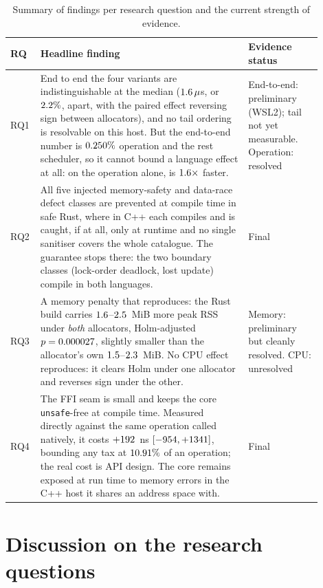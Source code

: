 \documentclass[english,twoside,openright,a4paper,censored,csm,software-track-2020]{HYthesisML}
\begin{document}
\begin{table}
\centering
\caption[Summary of findings per research question]{Summary of findings per research question and the current strength of evidence.
\label{tab:findings}}
\renewcommand{\arraystretch}{1.25}
\begin{tabular}{@{}p{0.06\linewidth} p{0.62\linewidth} p{0.22\linewidth}@{}}
\hline\hline
RQ & Headline finding & Evidence status \\
\hline
RQ1 & End to end the four variants are indistinguishable at the median ($1.6\,\mu$s,
or $2.2\%$, apart, with the paired effect reversing sign between allocators), and no
tail ordering is resolvable on this host. But the end-to-end number is
$0.250\%$ operation and the rest scheduler, so it cannot bound a language effect
at all: on the operation alone, \BudgetCoreFaster{} is $1.6\times$ faster. &
End-to-end: preliminary (WSL2); tail not yet measurable. Operation: resolved \\
RQ2 & All five injected memory-safety and data-race defect classes are prevented at compile
time in safe Rust, where in C++ each compiles and is caught, if at all, only at runtime and no
single sanitiser covers the whole catalogue. The guarantee stops there: the two boundary
classes (lock-order deadlock, lost update) compile in both languages. & Final \\
RQ3 & A memory penalty that reproduces: the Rust build carries
$1.6$--$2.5$~MiB more peak RSS under \emph{both} allocators, Holm-adjusted
$p=0.000027$, slightly smaller than the allocator's own
$1.5$--$2.3$~MiB. No CPU effect reproduces: it clears Holm under one
allocator and reverses sign under the other. & Memory: preliminary but cleanly resolved. CPU:
unresolved \\
RQ4 & The FFI seam is small and keeps the core \texttt{unsafe}-free at compile time. Measured
directly against the same operation called natively, it costs $+192$~ns
$[-954, +1341]$, bounding any tax at $10.91\%$ of an operation; the
real cost is API design. The core remains exposed at run time to memory errors in the C++ host
it shares an address space with. & Final \\
\hline
\end{tabular}
\end{table}

\section{Discussion on the research questions}
\end{document}
